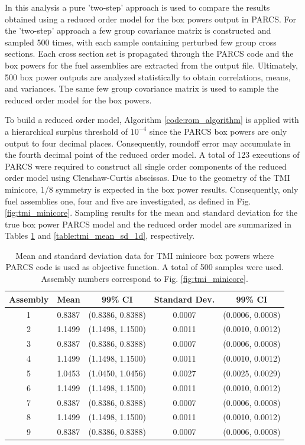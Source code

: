In this analysis a pure 'two-step' approach is used to compare the results obtained using a reduced order model for the box powers output in \ac{PARCS}. For the 'two-step' approach a few group covariance matrix is constructed and sampled 500 times, with each sample containing perturbed few group cross sections. Each cross section set is propagated through the \ac{PARCS} code and the box powers for the fuel assemblies are extracted from the output file. Ultimately, 500 box power outputs are analyzed statistically to obtain correlations, means, and variances. The same few group covariance matrix is used to sample the reduced order model for the box powers.    

To build a reduced order model, Algorithm \ref{code:rom_algorithm} is applied with a hierarchical surplus threshold of $10^{-4}$ since the \ac{PARCS} box powers are only output to four decimal places. Consequently, roundoff error may accumulate in the fourth decimal point of the reduced order model. A total of 123 executions of \ac{PARCS} were required to construct all single order components of the reduced order model using Clenshaw-Curtis abscissas. Due to the geometry of the \ac{TMI} minicore, 1/8 symmetry is expected in the box power results. Consequently, only fuel assemblies one, four and five are investigated, as defined in Fig. \ref{fig:tmi_minicore}. Sampling results for the mean and standard deviation for the true box power \ac{PARCS} model and the reduced order model are summarized in Tables \ref{table:tmi_mean_sd_mc} and \ref{table:tmi_mean_sd_1d}, respectively. 
%
\begin{table}[!htb] 
\caption[Mean and standard deviation data for \ac{TMI} minicore box powers where the \ac{PARCS} code is the objective function.]{\label{table:tmi_mean_sd_mc} 
Mean and standard deviation data for \ac{TMI} minicore box powers where \ac{PARCS} code is used as objective function. A total of 500 samples were used. Assembly numbers correspond to Fig. \ref{fig:tmi_minicore}.}
\centering
\begin{tabular}{||c|c|c|c|c||} 
\hline \hline
\textbf{Assembly} & \textbf{Mean} & \textbf{99\% CI} & \textbf{Standard Dev.} & \textbf{99\% CI} \\ \hline
1 & 0.8387 & (0.8386, 0.8388) & 0.0007 & (0.0006, 0.0008) \\ \hline 
2 & 1.1499 & (1.1498, 1.1500) & 0.0011 & (0.0010, 0.0012) \\ \hline
3 & 0.8387 & (0.8386, 0.8388) & 0.0007 & (0.0006, 0.0008) \\ \hline
4 & 1.1499 & (1.1498, 1.1500) & 0.0011 & (0.0010, 0.0012) \\ \hline
5 & 1.0453 & (1.0450, 1.0456) & 0.0027 & (0.0025, 0.0029) \\ \hline
6 & 1.1499 & (1.1498, 1.1500) & 0.0011 & (0.0010, 0.0012) \\ \hline
7 & 0.8387 & (0.8386, 0.8388) & 0.0007 & (0.0006, 0.0008) \\ \hline
8 & 1.1499 & (1.1498, 1.1500) & 0.0011 & (0.0010, 0.0012) \\ \hline
9 & 0.8387 & (0.8386, 0.8388) & 0.0007 & (0.0006, 0.0008) \\ 
\hline \hline
\end{tabular}
\end{table}
